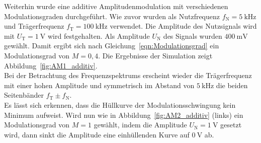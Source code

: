 \documentclass[a4paper,twoside,final]{article}
\begin{document}
Weiterhin wurde eine additive Amplitudenmodulation mit verschiedenen Modulationsgraden durchgeführt. Wie zuvor wurden als Nutzfrequenz $f_\text{N} = \SI{5}{\kilo\hertz}$ und Trägerfrequenz $f_\text{T} = \SI{100}{\kilo\hertz}$ verwendet. Die Amplitude des Nutzsignals wird mit $U_\text{T} = \SI{1}{\volt}$ wird festgehalten. Als Amplitude $U_\text{N}$ des Signals wurden $\SI{400}{\milli\volt}$ gewählt. Damit ergibt sich nach Gleichung~\eqref{eqn:Modulationsgrad} ein Modulationsgrad von $M = 0,4$. Die Ergebnisse der Simulation zeigt Abbildung~\ref{fig:AM1_additiv}.\\
Bei der Betrachtung des Frequenzspektrums erscheint wieder die Trägerfrequenz mit einer hohen Amplitude und symmetrisch im Abstand von $\SI{5}{\kilo\hertz}$ die beiden Seitenbänder $f_\text{T}\pm f_\text{N}$.\\
Es lässt sich erkennen, dass die Hüllkurve der Modulationsschwingung kein Minimum aufweist. Wird nun wie in Abbildung~\ref{fig:AM2_additiv} (links) ein Modulationsgrad von $M = 1$ gewählt, indem die Amplitude $U_\text{N} = \SI{1}{\volt}$ gesetzt wird, dann sinkt die Amplitude eine einhüllenden Kurve auf $\SI{0}{\volt}$ ab.
\end{document}

